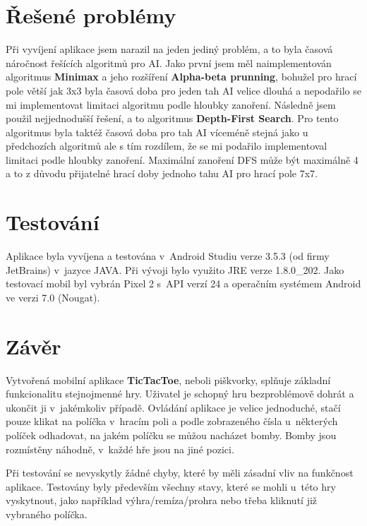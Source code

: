 \documentclass[12pt, a4paper]{article}
\begin{document}
\section{Řešené problémy}
Při vyvíjení aplikace jsem narazil na jeden jediný problém, a to byla časová náročnost řešících algoritmů pro AI. Jako první jsem měl naimplementován algoritmus \textbf{Minimax} a jeho rozšíření \textbf{Alpha-beta prunning}, bohužel pro hrací pole větší jak 3x3 byla časová doba pro jeden tah AI velice dlouhá a nepodařilo se mi implementovat limitaci algoritmu podle hloubky zanoření. Následně jsem použil nejjednodušší řešení, a to algoritmus \textbf{Depth-First Search}. Pro tento algoritmus byla taktéž časová doba pro tah AI víceméně stejná jako u předchozích algoritmů ale s tím rozdílem, že se mi podařilo implementoval limitaci podle hloubky zanoření. Maximální zanoření DFS může být maximálně 4 a to z důvodu přijatelné hrací doby jednoho tahu AI pro hrací pole 7x7.
\newpage


\section{Testování}
Aplikace byla vyvíjena a testována v~Android Studiu verze 3.5.3 (od firmy JetBrains) v~jazyce JAVA. Při vývoji bylo využito JRE verze 1.8.0\_202. Jako testovací mobil byl vybrán Pixel 2 s~API verzí 24 a operačním systémem Android ve verzi 7.0 (Nougat). 
\newpage


\section{Závěr}
Vytvořená mobilní aplikace \textbf{TicTacToe}, neboli piškvorky, splňuje základní funkcionalitu stejnojmenné hry. Uživatel je schopný hru bezproblémově dohrát a ukončit ji v~jakémkoliv případě. Ovládání aplikace je velice jednoduché, stačí pouze klikat na políčka v~hracím poli a podle zobrazeného čísla u~některých políček odhadovat, na jakém políčku se můžou nacházet bomby. Bomby jsou rozmístěny náhodně, v~každé hře jsou na jiné pozici. 
\par
Při testování se nevyskytly žádné chyby, které by měli zásadní vliv na funkčnost aplikace. Testovány byly především všechny stavy, které se mohli u~této hry vyskytnout, jako například výhra/remíza/prohra nebo třeba kliknutí již vybraného políčka.
\end{document}
